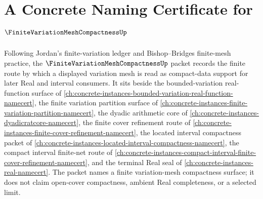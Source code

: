 \chapter{A Concrete Naming Certificate for $\FiniteVariationMeshCompactnessUp$}
\label{ch:concrete-instances-finite-variation-mesh-compactness-namecert}

Following Jordan's finite-variation ledger and Bishop--Bridges finite-mesh practice, the $\FiniteVariationMeshCompactnessUp$ packet records the finite route by which a displayed variation mesh is read as compact-data support for later Real and interval consumers. It sits beside the bounded-variation real-function surface of \autoref{ch:concrete-instances-bounded-variation-real-function-namecert}, the finite variation partition surface of \autoref{ch:concrete-instances-finite-variation-partition-namecert}, the dyadic arithmetic core of \autoref{ch:concrete-instances-dyadicratcore-namecert}, the finite cover refinement route of \autoref{ch:concrete-instances-finite-cover-refinement-namecert}, the located interval compactness packet of \autoref{ch:concrete-instances-located-interval-compactness-namecert}, the compact interval finite-net route of \autoref{ch:concrete-instances-compact-interval-finite-cover-refinement-namecert}, and the terminal Real seal of \autoref{ch:concrete-instances-real-namecert}. The packet names a finite variation-mesh compactness surface; it does not claim open-cover compactness, ambient Real completeness, or a selected limit.

